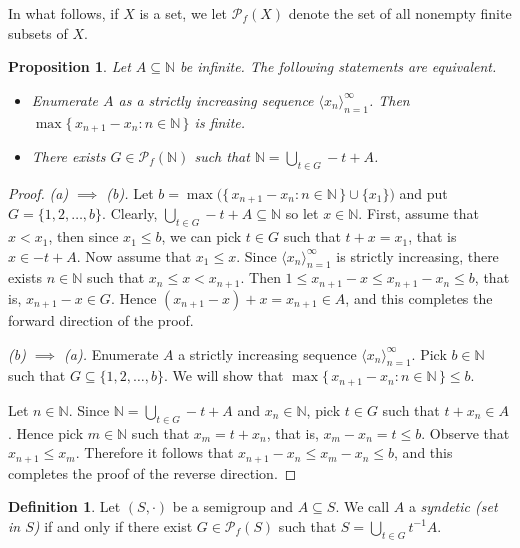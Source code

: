 \documentclass[12pt,showtrims]{memoir}
\theoremstyle{plain}
\newtheorem{prop}[thm]{Proposition}
\theoremstyle{definition}
\newtheorem{defn}[thm]{Definition}
\newcommand{\la}{\langle}
\newcommand{\ra}{\rangle}
\newcommand{\bbN}{\mathbb{N}}
\newcommand{\Pf}{\mathcal{P}_f}
\begin{document}
In what follows, if $X$ is a set, we let $\Pf(X)$ denote the set of all nonempty finite subsets of $X$. 

\begin{prop}
  \label{prop:syn}
  Let $A \subseteq \bbN$ be infinite.
  The following statements are equivalent.
  \begin{itemize}
    \item[(a)] Enumerate $A$ as a strictly increasing sequence $\la x_n \ra_{n=1}^\infty$.
      Then $\max\{\, x_{n+1} - x_n : n \in \bbN \,\}$ is finite.

    \item[(b)] There exists $G \in \Pf(\bbN)$ such that $\bbN = \bigcup_{t \in G} -t + A$. 
  \end{itemize}
\end{prop}
\begin{proof}
  \textsl{(a) $\implies$ (b).}
  Let $b = \max\bigl(\{\, x_{n+1} - x_n : n \in \bbN \,\} \cup \{x_1\}\bigr)$ and put $G = \{1, 2, \ldots, b\}$. 
  Clearly, $\bigcup_{t \in G} -t + A \subseteq \bbN$ so let $x \in \bbN$. 
  First, assume that $x < x_1$, then since $x_1 \le b$, we can pick $t \in G$ such that $t + x = x_1$, that is $x \in -t + A$.
  Now assume that $x_1 \le x$.
  Since $\la x_n \ra_{n=1}^\infty$ is strictly increasing, there exists $n \in \bbN$ such that $x_n \le x < x_{n+1}$.  
  Then $1 \le x_{n+1} - x \le x_{n+1} - x_n \le b$, that is, $x_{n+1} - x \in G$.
  Hence $(x_{n+1} - x) + x = x_{n+1} \in A$, and this completes the forward direction of the proof.

  \textsl{(b) $\implies$ (a).}
  Enumerate $A$ a strictly increasing sequence $\la x_n \ra_{n=1}^\infty$. 
  Pick $b \in \bbN$ such that $G \subseteq \{1, 2, \ldots, b\}$.
  We will show that $\max\{\, x_{n+1} - x_n : n \in \bbN \,\} \le b$. 

  Let $n \in \bbN$.
  Since $\bbN = \bigcup_{t \in G} -t+A$ and $x_n \in \bbN$, pick $t \in G$ such that $t + x_n \in A$.
  Hence pick $m \in \bbN$ such that $x_m = t + x_n$, that is, $x_m - x_n = t \le b$. 
  Observe that $x_{n+1} \le x_m$.
  Therefore it follows that $x_{n+1} - x_n \le x_m - x_n \le b$, and this completes the proof of the reverse direction.
\end{proof}

\begin{defn}
  Let $(S, \cdot)$ be a semigroup and $A \subseteq S$.
  We call $A$ a \emph{syndetic (set in $S$)} if and only if there exist $G \in \Pf(S)$ such that $S = \bigcup_{t \in G} t^{-1}A$. 
\end{defn}
\end{document}
